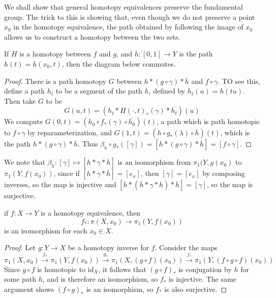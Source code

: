 We shall show that general homotopy equivalences preserve the fundamental group. The trick to this is showing that, even though we do not preserve a point $x_0$ in the homotopy equivalence, the path obtained by following the image of $x_0$ allows us to construct a homotopy between the two sets.

\begin{lemma}
    If $H$ is a homotopy between $f$ and $g$, and $h: [0,1] \to Y$ is the path $h(t) = h(x_0,t)$, then the diagram below commutes.
    \begin{center}
    \end{center}
\end{lemma}
\begin{proof}
    There is a path homotopy $G$ between $h * (g \circ \gamma) * \overline{h}$ and $f \circ \gamma$. TO see this, define a path $h_t$ to be a segment of the path $h$, defined by $h_t(u) = h(tu)$. Then take $G$ to be
    \[ G(u,t) = (h_t * H(\cdot, t)_*(\gamma) * \overline{h_t})(u) \]
    We compute $G(0,t) = (h_0 \circ f_*(\gamma) \circ \overline{h_0})(t)$, a path which is path homotopic to $f \circ \gamma$ by reparameterization, and $G(1,t) = (h \circ g_*(\lambda) \circ \overline{h})(t)$, which is the path $h * (g \circ \gamma) * \overline{h}$. Thus $\beta_h \circ g_*([\gamma]) = [h * (g \circ \gamma) * \overline{h}] = [f \circ \gamma]$.
\end{proof}

We note that $\beta_h: [\gamma] \mapsto [h * \gamma * \overline{h}]$ is an isomorphism from $\pi_1(Y, g(x_0)$ to $\pi_1(Y, f(x_0))$, since if $[h * \gamma * \overline{h}] = [e_x]$, then $[\gamma] = [e_x]$ by composing inverses, so the map is injective and $[h * (\overline{h} * \gamma * h) * \overline{h}] = [\gamma]$, so the map is surjective.

\begin{theorem}
    if $f: X \to Y$ is a homotopy equivalence, then
    \[ f_*: \pi(X, x_0) \to \pi_1(Y, f(x_0)) \]
    is an isomorphism for each $x_0 \in X$.
\end{theorem}
\begin{proof}
    Let $g: Y \to X$ be a homotopy inverse for $f$. Consider the maps
    \[ \pi_1(X,x_0) \xrightarrow{f_*} \pi_1(Y, f(x_0)) \xrightarrow{g_*} \pi_1(X, (g \circ f)(x_0)) \xrightarrow{f_*} \pi_1(Y, (f \circ g \circ f)(x_0)) \]
    Since $g \circ f$ is homotopic to $\text{id}_X$, it follows that $(g \circ f)_*$ is conjugation by $h$ for some path $h$, and is therefore an isomorphism, so $f_*$ is injective. The same argument shows $(f \circ g)_*$ is an isomorphism, so $f_*$ is also surjective.
\end{proof}

